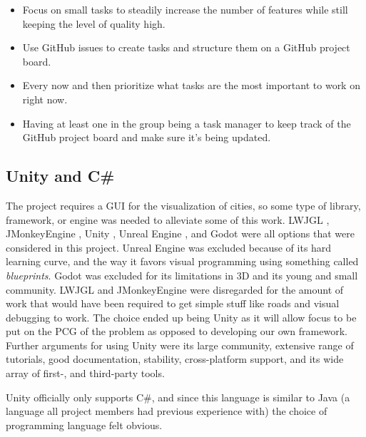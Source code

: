 \begin{itemize}
    \item Focus on small tasks to steadily increase the number of features while still keeping the level of quality high.  
    \item Use GitHub issues to create tasks and structure them on a GitHub project board. 
    \item Every now and then prioritize what tasks are the most important to work on right now.
    \item Having at least one in the group being a task manager to keep track of the GitHub project board and make sure it's being updated.
\end{itemize}

\subsection{Unity and C\#}
The project requires a GUI for the visualization of cities, so some type of library, framework, or engine was needed to alleviate some of this work.
LWJGL \cite{lwjgl}, JMonkeyEngine \cite{jmonkey}, Unity \cite{unity}, Unreal Engine \cite{unreal}, and Godot \cite{godot} were all options that were considered in this project.
Unreal Engine was excluded because of its hard learning curve, and the way it favors visual programming using something called \textit{blueprints}.
Godot was excluded for its limitations in 3D and its young and small community.
LWJGL and JMonkeyEngine were disregarded for the amount of work that would have been required to get simple stuff like roads and visual debugging to work.
The choice ended up being Unity as it will allow focus to be put on the PCG of the problem as opposed to developing our own framework.
Further arguments for using Unity were its large community, extensive range of tutorials, good documentation, stability, cross-platform support, and its wide array of first-, and third-party tools.

Unity officially only supports C\#, and since this language is similar to Java (a language all project members had previous experience with) the choice of programming language felt obvious.
